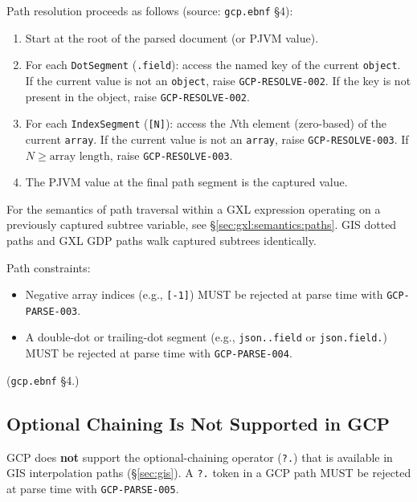 Path resolution proceeds as follows (source: \texttt{gcp.ebnf} \S4):

\begin{enumerate}
  \item Start at the root of the parsed document (or PJVM value).
  \item For each \texttt{DotSegment} (\texttt{.field}):
    access the named key of the current \texttt{object}.
    If the current value is not an \texttt{object}, raise
    \texttt{GCP-RESOLVE-002}.
    If the key is not present in the object, raise
    \texttt{GCP-RESOLVE-002}.
  \item For each \texttt{IndexSegment} (\texttt{[N]}):
    access the $N$th element (zero-based) of the current \texttt{array}.
    If the current value is not an \texttt{array}, raise
    \texttt{GCP-RESOLVE-003}.
    If $N \geq \text{array length}$, raise
    \texttt{GCP-RESOLVE-003}.
  \item The PJVM value at the final path segment is the captured value.
\end{enumerate}

For the semantics of path traversal within a GXL expression operating
on a previously captured subtree variable, see \S\ref{sec:gxl:semantics:paths}.
GIS dotted paths and GXL GDP paths walk captured subtrees identically.

\noindent Path constraints:

\begin{itemize}
  \item Negative array indices (e.g., \texttt{[-1]}) MUST be rejected at
    parse time with \texttt{GCP-PARSE-003}.

  \item A double-dot or trailing-dot segment (e.g., \texttt{json..field}
    or \texttt{json.field.}) MUST be rejected at parse time with
    \texttt{GCP-PARSE-004}.
\end{itemize}

(\texttt{gcp.ebnf} \S4.)

\subsection{Optional Chaining Is Not Supported in GCP}
\label{subsec:gcp:traversal:no-optional-chaining}

GCP does \textbf{not} support the optional-chaining operator (\texttt{?.})
that is available in GIS interpolation paths (\S\ref{sec:gis}).
A \texttt{?.} token in a GCP path MUST be rejected at parse time with
\texttt{GCP-PARSE-005}.


